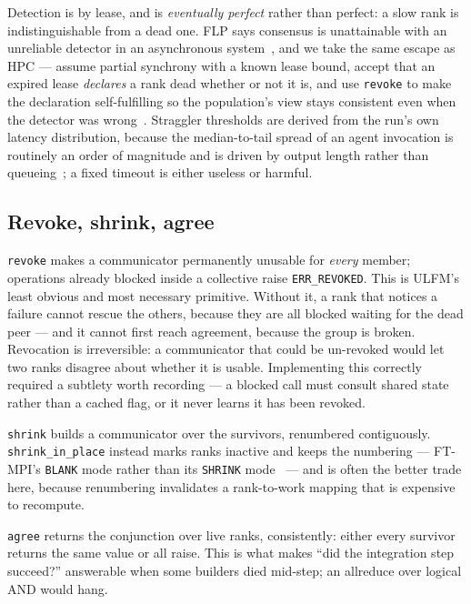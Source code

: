 \documentclass[10pt,twocolumn]{article}
\theoremstyle{definition}
\theoremstyle{plain}
\newcommand{\code}[1]{\texttt{\small #1}}
\begin{document}
Detection is by lease, and is \emph{eventually perfect} rather than perfect: a slow
rank is indistinguishable from a dead one. FLP says consensus is unattainable with
an unreliable detector in an asynchronous system~\cite{fischer85flp}, and we take
the same escape as HPC --- assume partial synchrony with a known lease bound, accept
that an expired lease \emph{declares} a rank dead whether or not it is, and use
\code{revoke} to make the declaration self-fulfilling so the population's view
stays consistent even when the detector was wrong~\cite{chandra96failuredetectors}.
Straggler thresholds are derived from the run's own latency distribution, because
the median-to-tail spread of an agent invocation is routinely an order of magnitude
and is driven by output length rather than queueing~\cite{dean13tail}; a fixed
timeout is either useless or harmful.

\subsection{Revoke, shrink, agree}

\code{revoke} makes a communicator permanently unusable for \emph{every} member;
operations already blocked inside a collective raise \code{ERR\_REVOKED}. This is
ULFM's least obvious and most necessary primitive. Without it, a rank that notices
a failure cannot rescue the others, because they are all blocked waiting for the
dead peer --- and it cannot first reach agreement, because the group is broken.
Revocation is irreversible: a communicator that could be un-revoked would let two
ranks disagree about whether it is usable. Implementing this correctly required a
subtlety worth recording --- a blocked call must consult shared state rather than a
cached flag, or it never learns it has been revoked.

\code{shrink} builds a communicator over the survivors, renumbered contiguously.
\code{shrink\_in\_place} instead marks ranks inactive and keeps the numbering ---
FT-MPI's \code{BLANK} mode rather than its \code{SHRINK} mode~\cite{fagg00-ftmpi}
--- and is often the better trade here, because renumbering invalidates a
rank-to-work mapping that is expensive to recompute.

\code{agree} returns the conjunction over live ranks, consistently: either every
survivor returns the same value or all raise. This is what makes ``did the
integration step succeed?'' answerable when some builders died mid-step; an
allreduce over logical AND would hang.
\end{document}
